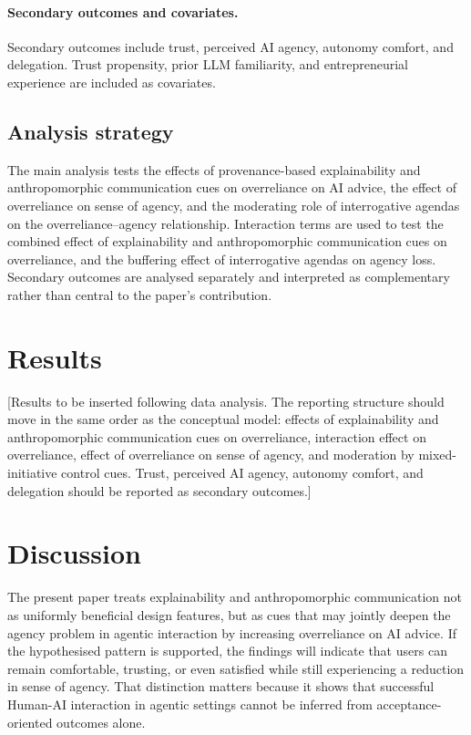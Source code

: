 \documentclass[sigconf,review,anonymous]{acmart}
\begin{document}
\paragraph{Secondary outcomes and covariates.}
Secondary outcomes include trust, perceived AI agency, autonomy comfort, and delegation. Trust propensity, prior LLM familiarity, and entrepreneurial experience are included as covariates.

\subsection{Analysis strategy}

The main analysis tests the effects of provenance-based explainability and anthropomorphic communication cues on overreliance on AI advice, the effect of overreliance on sense of agency, and the moderating role of interrogative agendas on the overreliance--agency relationship. Interaction terms are used to test the combined effect of explainability and anthropomorphic communication cues on overreliance, and the buffering effect of interrogative agendas on agency loss. Secondary outcomes are analysed separately and interpreted as complementary rather than central to the paper’s contribution.

\section{Results}

[Results to be inserted following data analysis. The reporting structure should move in the same order as the conceptual model: effects of explainability and anthropomorphic communication cues on overreliance, interaction effect on overreliance, effect of overreliance on sense of agency, and moderation by mixed-initiative control cues. Trust, perceived AI agency, autonomy comfort, and delegation should be reported as secondary outcomes.]

\section{Discussion}

The present paper treats explainability and anthropomorphic communication not as uniformly beneficial design features, but as cues that may jointly deepen the agency problem in agentic interaction by increasing overreliance on AI advice. If the hypothesised pattern is supported, the findings will indicate that users can remain comfortable, trusting, or even satisfied while still experiencing a reduction in sense of agency. That distinction matters because it shows that successful Human-AI interaction in agentic settings cannot be inferred from acceptance-oriented outcomes alone.
\end{document}
